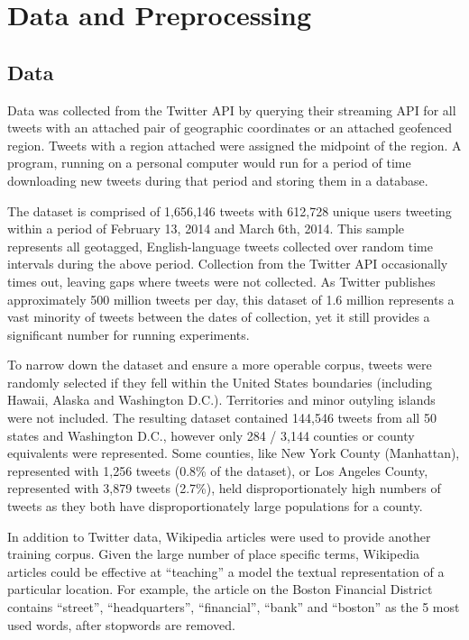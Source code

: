 \documentclass[midd]{thesis}
\begin{document}
\chapter{Data and Preprocessing}
\section{Data}

Data was collected from the Twitter API by querying their streaming API for all tweets with an attached pair of geographic coordinates or an attached geofenced region. Tweets with a region attached were assigned the midpoint of the region. A program, running on a personal computer would run for a period of time downloading new tweets during that period and storing them in a database. 

The dataset is comprised of 1,656,146 tweets with 612,728 unique users tweeting within a period of February 13, 2014 and March 6th, 2014. This sample represents all geotagged, English-language tweets collected over random time intervals during the above period. Collection from the Twitter API occasionally times out, leaving gaps where tweets were not collected. As Twitter publishes approximately 500 million tweets per day, this dataset of 1.6 million represents a vast minority of tweets between the dates of collection, yet it still provides a significant number for running experiments.

To narrow down the dataset and ensure a more operable corpus, tweets were randomly selected if they fell within the United States boundaries (including Hawaii, Alaska and Washington D.C.). Territories and minor outyling islands were not included. The resulting dataset contained 144,546 tweets from all 50 states and Washington D.C., however only 284 / 3,144 counties or county equivalents were represented. Some counties, like New York County (Manhattan), represented with 1,256 tweets (0.8\% of the dataset), or Los Angeles County, represented with 3,879 tweets (2.7\%), held disproportionately high numbers of tweets as they both have disproportionately large populations for a county.

In addition to Twitter data, Wikipedia articles were used to provide another training corpus. Given the large number of place specific terms, Wikipedia articles could be effective at ``teaching'' a model the textual representation of a particular location. For example, the article on the Boston Financial District contains ``street'', ``headquarters'', ``financial'', ``bank'' and ``boston'' as the 5 most used words, after stopwords are removed.
\end{document}
